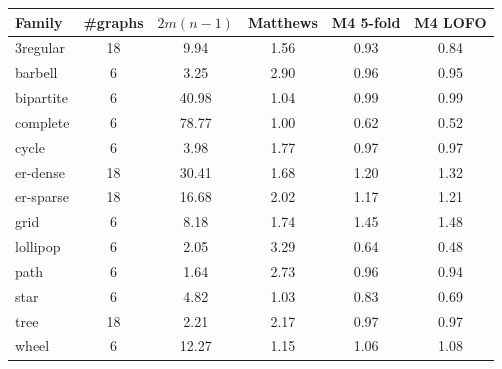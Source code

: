 \begin{tabular}{lccccc}
\toprule
Family & \#graphs & $2m(n-1)$ & Matthews & M4 5-fold & M4 LOFO \\
\midrule
3regular & 18 & 9.94 & 1.56 & 0.93 & 0.84 \\
barbell & 6 & 3.25 & 2.90 & 0.96 & 0.95 \\
bipartite & 6 & 40.98 & 1.04 & 0.99 & 0.99 \\
complete & 6 & 78.77 & 1.00 & 0.62 & 0.52 \\
cycle & 6 & 3.98 & 1.77 & 0.97 & 0.97 \\
er-dense & 18 & 30.41 & 1.68 & 1.20 & 1.32 \\
er-sparse & 18 & 16.68 & 2.02 & 1.17 & 1.21 \\
grid & 6 & 8.18 & 1.74 & 1.45 & 1.48 \\
lollipop & 6 & 2.05 & 3.29 & 0.64 & 0.48 \\
path & 6 & 1.64 & 2.73 & 0.96 & 0.94 \\
star & 6 & 4.82 & 1.03 & 0.83 & 0.69 \\
tree & 18 & 2.21 & 2.17 & 0.97 & 0.97 \\
wheel & 6 & 12.27 & 1.15 & 1.06 & 1.08 \\
\bottomrule
\end{tabular}